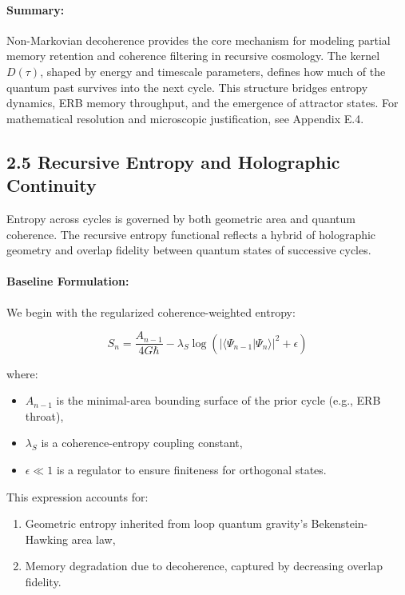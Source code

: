 \paragraph{Summary:}

Non-Markovian decoherence provides the core mechanism for modeling partial memory retention and coherence filtering in recursive cosmology. The kernel \( D(\tau) \), shaped by energy and timescale parameters, defines how much of the quantum past survives into the next cycle. This structure bridges entropy dynamics, ERB memory throughput, and the emergence of attractor states. For mathematical resolution and microscopic justification, see Appendix E.4.

\subsection*{2.5 Recursive Entropy and Holographic Continuity}

Entropy across cycles is governed by both geometric area and quantum coherence. The recursive entropy functional reflects a hybrid of holographic geometry and overlap fidelity between quantum states of successive cycles.

\paragraph{Baseline Formulation:}

We begin with the regularized coherence-weighted entropy:

\begin{equation}
S_n = \frac{A_{n-1}}{4G\hbar} - \lambda_S \log \left( |\langle \Psi_{n-1} | \Psi_n \rangle|^2 + \epsilon \right)
\end{equation}

\noindent
where:
\begin{itemize}
    \item \( A_{n-1} \) is the minimal-area bounding surface of the prior cycle (e.g., ERB throat),
    \item \( \lambda_S \) is a coherence-entropy coupling constant,
    \item \( \epsilon \ll 1 \) is a regulator to ensure finiteness for orthogonal states.
\end{itemize}

This expression accounts for:
\begin{enumerate}
    \item Geometric entropy inherited from loop quantum gravity’s Bekenstein-Hawking area law,
    \item Memory degradation due to decoherence, captured by decreasing overlap fidelity.
\end{enumerate}

